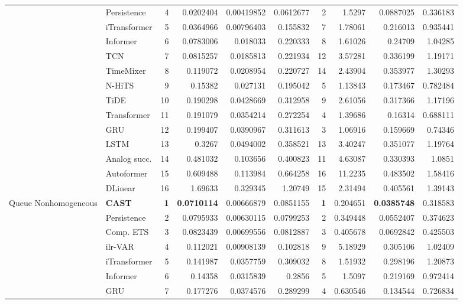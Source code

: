 \begin{longtable}{@{}llrrrrrrrr@{}}
 & Persistence & 4 & 0.0202404 & 0.00419852 & 0.0612677 & 2 & 1.5297 & 0.0887025 & 0.336183 \\
 & iTransformer & 5 & 0.0364966 & 0.00796403 & 0.155832 & 7 & 1.78061 & 0.216013 & 0.935441 \\
 & Informer & 6 & 0.0783006 & 0.018033 & 0.220333 & 8 & 1.61026 & 0.24709 & 1.04285 \\
 & TCN & 7 & 0.0815257 & 0.0185813 & 0.221934 & 12 & 3.57281 & 0.336199 & 1.19171 \\
 & TimeMixer & 8 & 0.119072 & 0.0208954 & 0.220727 & 14 & 2.43904 & 0.353977 & 1.30293 \\
 & N-HiTS & 9 & 0.15382 & 0.027131 & 0.195042 & 5 & 1.13843 & 0.173467 & 0.782484 \\
 & TiDE & 10 & 0.190298 & 0.0428669 & 0.312958 & 9 & 2.61056 & 0.317366 & 1.17196 \\
 & Transformer & 11 & 0.191079 & 0.0354214 & 0.272254 & 4 & 1.39686 & 0.16314 & 0.688111 \\
 & GRU & 12 & 0.199407 & 0.0390967 & 0.311613 & 3 & 1.06916 & 0.159669 & 0.74346 \\
 & LSTM & 13 & 0.3267 & 0.0494002 & 0.358521 & 13 & 3.40247 & 0.351077 & 1.19764 \\
 & Analog succ. & 14 & 0.481032 & 0.103656 & 0.400823 & 11 & 4.63087 & 0.330393 & 1.0851 \\
 & Autoformer & 15 & 0.609488 & 0.113984 & 0.664258 & 16 & 11.2235 & 0.483502 & 1.58416 \\
 & DLinear & 16 & 1.69633 & 0.329345 & 1.20749 & 15 & 2.31494 & 0.405561 & 1.39143 \\
\addlinespace
Queue Nonhomogeneous & \textbf{CAST} & \textbf{1} & \textbf{0.0710114} & 0.00666879 & 0.0851155 & \textbf{1} & 0.204651 & \textbf{0.0385748} & 0.318583 \\
 & Persistence & 2 & 0.0795933 & 0.00630115 & 0.0799253 & 2 & 0.349448 & 0.0552407 & 0.374623 \\
 & Comp. ETS & 3 & 0.0823439 & 0.00699556 & 0.0812887 & 3 & 0.405678 & 0.0692842 & 0.425503 \\
 & ilr-VAR & 4 & 0.112021 & 0.00908139 & 0.102818 & 9 & 5.18929 & 0.305106 & 1.02409 \\
 & iTransformer & 5 & 0.141987 & 0.0357759 & 0.309032 & 8 & 1.51932 & 0.298196 & 1.20873 \\
 & Informer & 6 & 0.14358 & 0.0315839 & 0.2856 & 5 & 1.5097 & 0.219169 & 0.972414 \\
 & GRU & 7 & 0.177276 & 0.0374576 & 0.289299 & 4 & 0.630546 & 0.134544 & 0.726834 \\

\end{longtable}
